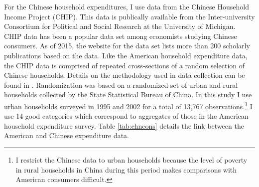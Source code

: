\documentclass[11pt]{article}
\begin{document}
\begin{CJK}{UTF8}{gbsn}
For the Chinese household expenditures, I use data from the Chinese Household Income Project (CHIP).\citep{CHIP2002} This data is publically available from the Inter-university Consortium for Political and Social Research at the University of Michigan.  CHIP data has been a popular data set among economists studying Chinese consumers.  As of 2015, the website for the data set lists more than 200 scholarly publications based on the data.  Like the American household expenditure data, the CHIP data is comprised of repeated cross-sections of a random selection of Chinese households.  Details on the methodology used in data collection can be found in \citet{khan1998income}.  Randomization was based on a randomized set of urban and rural households collected by the State Statistical Bureau of China.  In this study I use urban households surveyed in 1995 and 2002 for a total of 13,767 observations.\footnote{I restrict the Chinese data to urban households because the level of poverty in rural households in China during this period makes comparisons with American consumers difficult.}  I use 14 good categories which correspond to aggregates of those in the American household expenditure survey.   Table \ref{tab:chncons} details the link between the American and Chinese expenditure data.  


\end{CJK}
\end{document}
